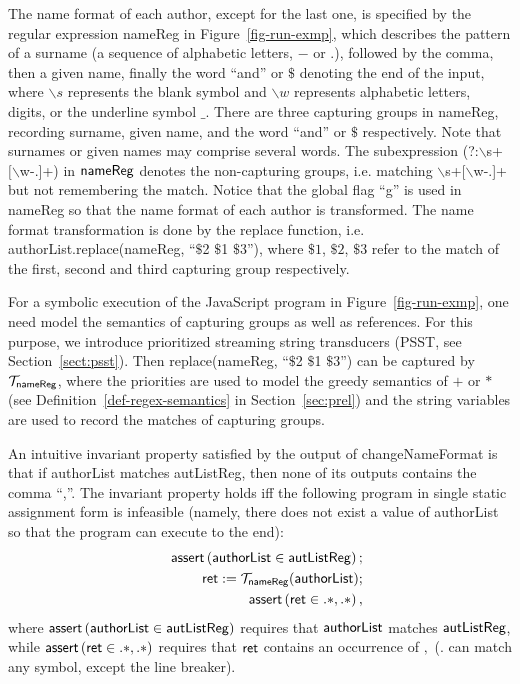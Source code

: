 The name format of each author, except for the last one, is specified by the regular expression {\sf nameReg}  in Figure~\ref{fig-run-exmp}, which describes the pattern of a surname (a sequence of alphabetic letters, $-$ or $.$), followed by the comma, then a given name, finally the word ``and'' or $\$$ denoting the end of the input, where $\backslash s$ represents the blank symbol and $\backslash w$ represents alphabetic letters, digits, or the underline symbol $\_$. There are three capturing groups in {\sf nameReg}, recording surname, given name, and the word ``and'' or $\$$ respectively. Note that surnames or given names may comprise several words. The subexpression (?:$\backslash$s+$[\backslash$w-.]+) in ${\sf nameReg}$ denotes the non-capturing groups, i.e. matching $\backslash$s+$[\backslash$w-.]+ but not remembering the match.
%
Notice that the global flag ``g'' is used in {\sf nameReg} so that the name format of each author is transformed. The name format transformation is done by the {\sf replace} function, i.e. {\sf authorList.replace(nameReg, ``$\$$2 $\$$1 $\$$3'')}, where $\$1$, $\$2$, $\$3$ refer to the match of the first, second and third capturing group respectively. 

For a symbolic execution of the JavaScript program in Figure~\ref{fig-run-exmp}, one need model the semantics of capturing groups as well as references. For this purpose, we introduce prioritized streaming string transducers (PSST, see Section~\ref{sect:psst}). Then {\sf replace(nameReg, ``$\$$2 $\$$1 $\$$3'')} can be captured by $\mathcal{T}_{\sf nameReg}$, where the priorities are used to model the greedy semantics of $+$ or $*$ (see Definition~\ref{def-regex-semantics} in Section~\ref{sec:prel}) and the string variables are used to record the matches of capturing groups.

An intuitive invariant property satisfied by the output of {\sf changeNameFormat} is that if {\sf authorList} matches {\sf autListReg}, then none of its outputs contains the comma ``,''. The invariant property holds iff the following program in single static assignment form is infeasible (namely, there does not exist a value of {\sf authorList} so that the program can execute to the end):
%
\begin{eqnarray}\label{eqn:exmp}
& & \textsf{assert}\left(\sf authorList \in autListReg\right);\nonumber \\
& & \sf ret  := \sf  \mathcal{T}_{nameReg}(authorList);\nonumber \\
& &  \textsf{assert}\left(\sf ret \in .*,.*\right),
\end{eqnarray}
%
where $\textsf{assert}\left(\sf authorList \in autListReg\right)$ requires that $\sf authorList$ matches $\sf autListReg$, while $\textsf{assert}\left(\sf ret \in .*,.*\right)$ requires that $\sf ret$ contains an occurrence of $,$ ($.$ can match any symbol, except the line breaker).


